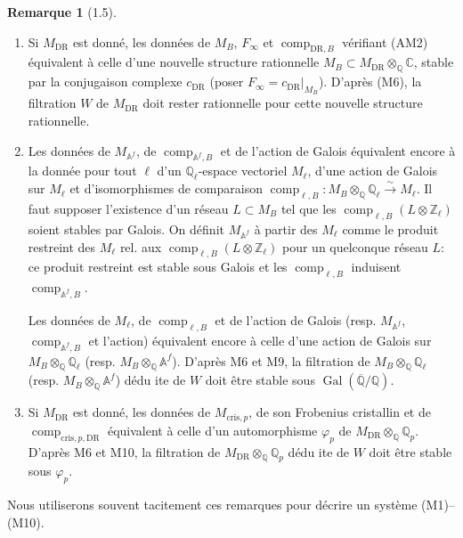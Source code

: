 \documentclass[12pt,a4paper]{article}
\theoremstyle{plain}
\theoremstyle{definition}
\newtheorem{remark}[theorem]{Remarque}
\theoremstyle{remark}
\DeclareMathOperator{\Gal}{Gal}
\providecommand{\Gal}{\operatorname{Gal}}
\providecommand{\DR}{\mathrm{DR}}
\providecommand{\cris}{\mathrm{cris}}
\providecommand{\comp}{\operatorname{comp}}
\begin{document}
\begin{remark}[1.5]\label{rem:1.5}
\leavevmode
\begin{enumerate}[label=(\roman*)]
\item Si $M_{\DR}$ est donn\'e, les donn\'ees de $M_B$, $F_\infty$ et $\comp_{\DR,B}$
v\'erifiant (AM2) \'equivalent \`a celle d'une nouvelle structure rationnelle
$M_B \subset M_{\DR} \otimes_{\mathbb{Q}} \mathbb{C}$, stable par la conjugaison complexe
$c_{\DR}$ (poser $F_\infty = c_{\DR}|_{M_B}$). D'apr\`es (M6), la filtration $W$ de
$M_{\DR}$ doit rester rationnelle pour cette nouvelle structure rationnelle.

\item Les donn\'ees de $M_{\mathbb{A}^f}$, de $\comp_{\mathbb{A}^f,B}$ et de l'action de
Galois \'equivalent encore \`a la donn\'ee pour tout $\ell$ d'un $\mathbb{Q}_\ell$-espace
vectoriel $M_\ell$, d'une action de Galois sur $M_\ell$ et d'isomorphismes de comparaison
$\comp_{\ell,B}: M_B \otimes_{\mathbb{Q}} \mathbb{Q}_\ell \xrightarrow{\sim} M_\ell$. Il faut
supposer l'existence d'un r\'eseau $L \subset M_B$ tel que les $\comp_{\ell,B}(L \otimes
\mathbb{Z}_\ell)$ soient stables par Galois. On d\'efinit $M_{\mathbb{A}^f}$ \`a partir des
$M_\ell$ comme le produit restreint des $M_\ell$ rel. aux $\comp_{\ell,B}(L \otimes
\mathbb{Z}_\ell)$ pour un quelconque r\'eseau $L$: ce produit restreint est stable sous
Galois et les $\comp_{\ell,B}$ induisent $\comp_{\mathbb{A}^f,B}$.

Les donn\'ees de $M_\ell$, de $\comp_{\ell,B}$ et de l'action de Galois (resp.
$M_{\mathbb{A}^f}$, $\comp_{\mathbb{A}^f,B}$ et l'action) \'equivalent encore \`a celle
d'une action de Galois sur $M_B \otimes_{\mathbb{Q}} \mathbb{Q}_\ell$ (resp.
$M_B \otimes_{\mathbb{Q}} \mathbb{A}^f$). D'apr\`es M6 et M9, la filtration de
$M_B \otimes_{\mathbb{Q}} \mathbb{Q}_\ell$ (resp. $M_B \otimes_{\mathbb{Q}} \mathbb{A}^f$) d\'edu ite de
$W$ doit \^etre stable sous $\Gal(\overline{\mathbb{Q}}/\mathbb{Q})$.

\item Si $M_{\DR}$ est donn\'e, les donn\'ees de $M_{\cris,p}$, de son Frobenius
cristallin et de $\comp_{\cris,p,\DR}$ \'equivalent \`a celle d'un automorphisme
$\varphi_p$ de $M_{\DR} \otimes_{\mathbb{Q}} \mathbb{Q}_p$. D'apr\`es M6 et M10, la filtration
de $M_{\DR} \otimes_{\mathbb{Q}} \mathbb{Q}_p$ d\'edu ite de $W$ doit \^etre stable sous
$\varphi_p$.
\end{enumerate}
Nous utiliserons souvent tacitement ces remarques pour d\'ecrire un syst\`eme
(M1)--(M10).
\end{remark}
\end{document}
